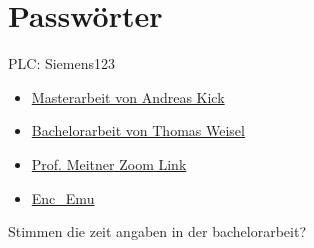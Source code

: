\chapter{Passwörter}

PLC: Siemens123

\begin{itemize}
    \item \href{https://siemens.sharepoint.com/teams/P0000045/Backbone/Abschlussarbeiten/Masterarbeit_Andreas_Kick.pdf}{Masterarbeit von Andreas Kick}
    \item \href{https://siemens.sharepoint.com/teams/P0000045/Backbone/Abschlussarbeiten/Bachelorarbeit_Thomas_Weisel.pdf}{Bachelorarbeit von Thomas Weisel}
    \item \href{https://th-nuernberg.zoom-x.de/j/2850045758}{Prof. Meitner Zoom Link}
    \item \href{https://asrdwiki.siemens.com/s7tfwiki/index.php/S7-1500/TM_EncEmu_1_(FPGA)}{Enc\_Emu}
\end{itemize}

Stimmen die zeit angaben in der bachelorarbeit?


